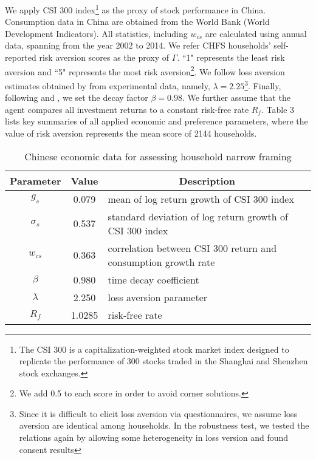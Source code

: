 \documentclass[ukenglish,nottitlepage,thmsb,11pt,letterpaper]{article}
\begin{document}
We apply CSI 300 index\footnote{The CSI 300 is a capitalization-weighted stock market index designed to replicate the performance of 300 stocks traded in the Shanghai and Shenzhen stock exchanges.} as the proxy of stock performance in China. Consumption data in China are obtained from the World Bank (World Development Indicators). All statistics, including $w_{cs}$ are calculated using annual data, spanning from the year 2002 to 2014. We refer CHFS
households' self-reported risk aversion scores as the proxy of $\Gamma$. ``1" represents the least risk aversion and ``5" represents the most risk aversion\footnote{We add 0.5 to each score in order to avoid corner solutions. }. We follow loss aversion estimates obtained by \citet{Tversky1992} from experimental data, namely, $\lambda = 2.25$\footnote{Since it is difficult to elicit loss aversion via questionnaires, we assume loss aversion are identical among households. In the robustness test, we tested the relations again by allowing some heterogeneity in loss version and found consent results}. Finally, following \citet{Barberis2009} and \citet{Giorgi2012}, we set the decay factor $\beta = 0.98$. We further assume that the agent compares all investment returns to a constant risk-free rate $R_f$. Table 3 lists key summaries  of all applied economic and preference parameters, where the value of risk aversion represents the mean score of 2144 households.   
 
  
 \begin{spacing}{1}
 	\begin{table}[H]
 		\renewcommand\arraystretch{1.25}%
 		\centering
 		\caption{Chinese economic data for assessing household narrow framing}
 		\begin{tabular}{ccl}
 			\toprule
 			Parameter   & \multicolumn{1}{c}{Value} & \multicolumn{1}{c}{Description} \\
 			\midrule

 			$g_s$         & 0.079      &   mean of log return growth of CSI 300 index \\
 			$\sigma_s$      & 0.537       &   standard deviation  of log return growth of CSI 300 index \\
 			$w_{cs}$       & 0.363       &  correlation between CSI 300 return and consumption growth rate\\
	     	$\beta$       & 0.980       &   time decay coefficient \\
	        $\lambda$       & 2.250       & loss aversion parameter \\
	        $R_f$       & 1.0285       & risk-free rate \\
 			\bottomrule
 		\end{tabular}%
 		\label{tab:addlabel}%
 	\end{table}%
 \end{spacing}
\end{document}
